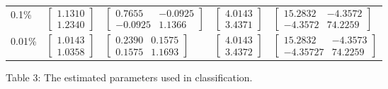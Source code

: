 \documentclass[ 12pt ]{article}
\begin{document}
\begin{enumerate}
\begin{enumerate}
\begin{center}
\begin{tabular}{|l|llll|}
                    0.1\% & $\begin{bmatrix} 1.1310 \\ 1.2340 \end{bmatrix}$ & $\begin{bmatrix} 0.7655 & -0.0925 \\ -0.0925 & 1.1366 \end{bmatrix}$ & $\begin{bmatrix}  4.0143 \\ 3.4371 \end{bmatrix}$ & $\begin{bmatrix} 15.2832 & -4.3572 \\ -4.3572 & 74.2259 \end{bmatrix}$\\
                    0.01\% & $\begin{bmatrix} 1.0143 \\ 1.0358 \end{bmatrix}$ & $\begin{bmatrix} 0.2390 & 0.1575 \\ 0.1575 & 1.1693 \end{bmatrix}$ & $\begin{bmatrix}  4.0143 \\ 3.4372 \end{bmatrix}$ & $\begin{bmatrix} 15.2832 & -4.3573 \\ -4.35727 & 74.2259 \end{bmatrix}$\\
         \hline
                \end{tabular}
                \newline
                \scriptsize
                    Table 3: The estimated parameters used in classification.
                \end{center}
        \end{enumerate}


\end{enumerate}
\end{document}
